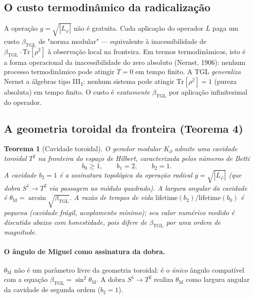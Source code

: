 \documentclass[12pt,a4paper]{article}
\newtheorem{theorem}{Teorema}
\newcommand{\betatgl}{\beta_{\text{TGL}}}
\newcommand{\thetaM}{\theta_{\text{M}}}
\newcommand{\Kpartial}{K_{\partial}}
\newcommand{\Lphi}{L_{\varphi}}
\newcommand{\TGL}{\textsc{TGL}}
\begin{document}
\subsection{O custo termodinâmico da radicalização}
\label{sec:radical-thermo}

A operação $g = \sqrt{|\Lphi|}$ não é gratuita.  Cada aplicação do operador
$L$ paga um custo $\betatgl$ de "norma modular" --- equivalente à
inacessibilidade de $\betatgl \cdot \mathrm{Tr}[\rho^{2}]$ à observação
local na fronteira.  Em termos termodinâmicos, isto é a forma operacional
da inacessibilidade do zero absoluto (Nernst, 1906): nenhum processo
termodinâmico pode atingir $T = 0$ em tempo finito.  A \TGL{}
\emph{generaliza} Nernst a álgebras tipo III\textsubscript{1}: nenhum
sistema pode atingir $\mathrm{Tr}[\rho^{2}] = 1$ (pureza absoluta) em
tempo finito.  O custo é \emph{exatamente} $\betatgl$ por aplicação
infinitesimal do operador.

\subsection{A geometria toroidal da fronteira (Teorema 4)}
\label{sec:radical-toroidal}

\begin{theorem}[Cavidade toroidal]
\label{th:toroidal}
O gerador modular $\Kpartial$ admite uma cavidade toroidal $T^{2}$ na
fronteira do espaço de Hilbert, caracterizada pelos números de Betti
\begin{equation}
b_{0} \geq 1, \qquad b_{1} = 2, \qquad b_{2} = 1.
\end{equation}
A cavidade $b_{2} = 1$ é a assinatura topológica da operação radical
$g = \sqrt{|\Lphi|}$ (que dobra $S^{1} \to T^{2}$ via passagem ao
módulo quadrado).  A largura angular da cavidade é
$\thetaM = \arcsin\sqrt{\betatgl}$.  A razão de tempos de vida
$\text{lifetime}(b_{2}) / \text{lifetime}(b_{0})$ é \emph{pequena} (cavidade
frágil, acoplamento mínimo); seu valor numérico medido é discutido abaixo com
honestidade, pois difere de $\betatgl$ por uma ordem de magnitude.
\end{theorem}

\paragraph{O ângulo de Miguel como assinatura da dobra.}
$\thetaM$ não é um parâmetro livre da geometria toroidal: é o \emph{único}
ângulo compatível com a equação $\betatgl = \sin^{2}\thetaM$.  A dobra
$S^{1} \to T^{2}$ realiza $\thetaM$ como largura angular da cavidade
de segunda ordem ($b_{2} = 1$).
\end{document}

